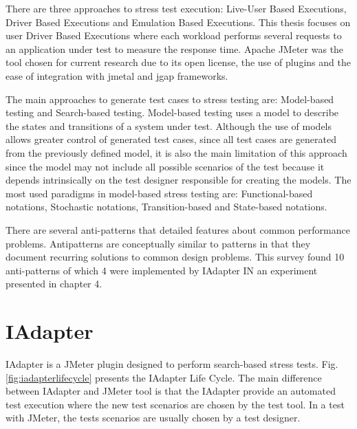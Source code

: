 \documentclass[espaco=umemeio,chapter=TITLE,twoside,openright]{abnt}
\begin{document}
There are three approaches to stress test execution: Live-User Based Executions, Driver Based Executions and Emulation Based Executions. This thesis focuses on user Driver Based Executions where each workload performs several requests to an application under test to measure the response time. Apache JMeter was the tool chosen for current research due to its open license, the use of plugins and the ease of integration with jmetal and jgap frameworks.

The main approaches to generate test cases to stress testing are: Model-based testing and Search-based testing. Model-based testing uses a model to describe the states and transitions of a system under test. Although the use of models allows greater control of generated test cases, since all test cases are generated from the previously defined model, it is also the main limitation of this approach since the model may not include all possible scenarios of the test because it depends intrinsically on the test designer responsible for creating the models. The most used paradigms in model-based stress testing are:  Functional-based notations, Stochastic notations, Transition-based and State-based notations. 

There are several anti-patterns that detailed features about common performance problems. Antipatterns
are conceptually similar to patterns in that they document recurring solutions to common design problems. This survey found 10 anti-patterns of which 4 were  implemented by IAdapter IN an experiment presented in chapter 4.



\chapter{IAdapter }



IAdapter is a JMeter plugin designed to perform search-based stress tests. Fig. \ref{fig:iadapterlifecycle} presents the IAdapter Life Cycle. The main difference between IAdapter and JMeter tool is that the IAdapter provide an automated test execution where the new test scenarios are chosen by the test tool.  In a test with JMeter, the tests scenarios are usually chosen by a test designer.
\end{document}
